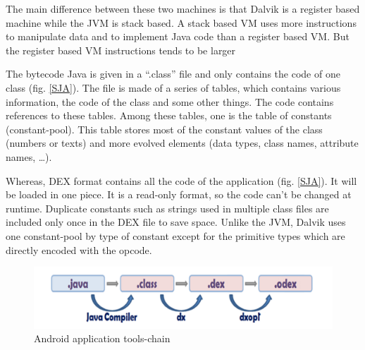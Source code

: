 \documentclass{sigplanconf}
\def \DALVIK{\mbox{Dalvik}\xspace}
\def \ANDROID{\mbox{Android}\xspace}
\def \JVM{JVM\xspace}
\def \DEX{\mbox{DEX}\xspace}
\begin{document}
      The main difference between these two machines is that \DALVIK is a register based machine while the \JVM is stack based.
      A stack based VM uses more instructions to manipulate data and to implement Java code than a register based VM.
      But the register based VM instructions tends to be larger \cite{ieee-paul-kundu-energy-perspective}

      The bytecode Java is given in a ``.class'' file and only contains the code of one class (fig. \ref{SJA}).
      The file is made of a series of tables, which contains various information, the code of the class and some other things.
      The code contains references to these tables.
      Among these tables, one is the table of constants (constant-pool).
      This table stores most of the constant values of the class (numbers or texts)
      and more evolved elements (data types, class names, attribute names, \dots).

      Whereas, \DEX format contains all the code of the application (fig. \ref{SJA}).
      It will be loaded in one piece.
      It is a read-only format, so the code can't be changed at runtime.
      Duplicate constants such as strings used in multiple class files
      are included only once in the \DEX file to save space.
      Unlike the \JVM, \DALVIK uses one constant-pool by type of constant
      except for the primitive types which are directly encoded with the opcode.\\

      \begin{figure}[t]
        \centering
        \includegraphics[width=\columnwidth]{dex-tools-chain.png}
        \caption{\ANDROID application tools-chain}
        \label{DTC}
      \end{figure}
\end{document}

